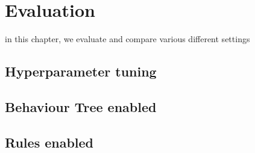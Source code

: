 \chapter{Evaluation}
in this chapter, we evaluate and compare various different settings
\section{Hyperparameter tuning}
\section{Behaviour Tree enabled}
\section{Rules enabled}
